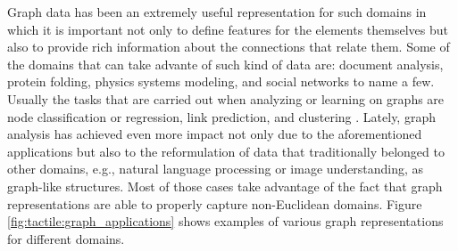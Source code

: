Graph data has been an extremely useful representation for such domains in which it is important not only to define features for the elements themselves but also to provide rich information about the connections that relate them. Some of the domains that can take advante of such kind of data are: document analysis, protein folding, physics systems modeling, and social networks to name a few. Usually the tasks that are carried out when analyzing or learning on graphs are node classification or regression, link prediction, and clustering \cite{Zhou2018}. Lately, graph analysis has achieved even more impact not only due to the aforementioned applications but also to the reformulation of data that traditionally belonged to other domains, e.g., natural language processing or image understanding, as graph-like structures. Most of those cases take advantage of the fact that graph representations are able to properly capture non-Euclidean domains. Figure \ref{fig:tactile:graph_applications} shows examples of various graph representations for different domains.

